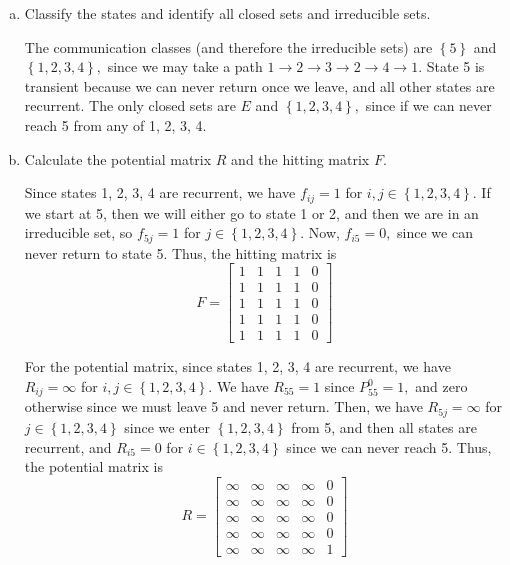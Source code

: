 \documentclass{article}
\begin{document}
\begin{enumerate}
		\begin{enumerate}[(a)]
			\item Classify the states and identify all closed sets and irreducible sets.
				\begin{soln}
					The communication classes (and therefore the irreducible sets) are $\left\{ 5 \right\}$ and $\left\{ 1, 2, 3, 4 \right\},$ since we may take a path $1\to2\to3\to2\to4\to1.$ State 5 is transient because we can never return once we leave, and all other states are recurrent. The only closed sets are $E$ and $\left\{ 1, 2, 3, 4\right\},$ since if we can never reach 5 from any of 1, 2, 3, 4. 
				\end{soln}

			\item Calculate the potential matrix $R$ and the hitting matrix $F.$
				\begin{soln}
					Since states 1, 2, 3, 4 are recurrent, we have $f_{ij}=1$ for $i, j\in\left\{ 1, 2, 3, 4 \right\}.$ If we start at 5, then we will either go to state 1 or 2, and then we are in an irreducible set, so $f_{5j}=1$ for $j\in\left\{ 1, 2, 3, 4 \right\}.$ Now, $f_{i5}=0,$ since we can never return to state 5. Thus, the hitting matrix is
					\[F=\begin{bmatrix}
							1 & 1 & 1 & 1 & 0 \\
							1 & 1 & 1 & 1 & 0 \\
							1 & 1 & 1 & 1 & 0 \\
							1 & 1 & 1 & 1 & 0 \\
							1 & 1 & 1 & 1 & 0
					\end{bmatrix}\]

					For the potential matrix, since states 1, 2, 3, 4 are recurrent, we have $R_{ij}=\infty$ for $i, j\in\left\{ 1, 2, 3, 4 \right\}.$ We have $R_{55}=1$ since $P_{55}^0=1,$ and zero otherwise since we must leave 5 and never return. Then, we have $R_{5j}=\infty$ for $j\in\left\{ 1, 2, 3, 4 \right\}$ since we enter $\left\{ 1, 2, 3, 4 \right\}$ from 5, and then all states are recurrent, and $R_{i5}=0$ for $i\in\left\{ 1, 2, 3, 4 \right\}$ since we can never reach 5. Thus, the potential matrix is
					\[R=\begin{bmatrix}
							\infty & \infty & \infty & \infty & 0 \\
							\infty & \infty & \infty & \infty & 0 \\
							\infty & \infty & \infty & \infty & 0 \\
							\infty & \infty & \infty & \infty & 0 \\
							\infty & \infty & \infty & \infty & 1
					\end{bmatrix}\]
				\end{soln}


\end{enumerate}
\end{enumerate}
\end{document}
